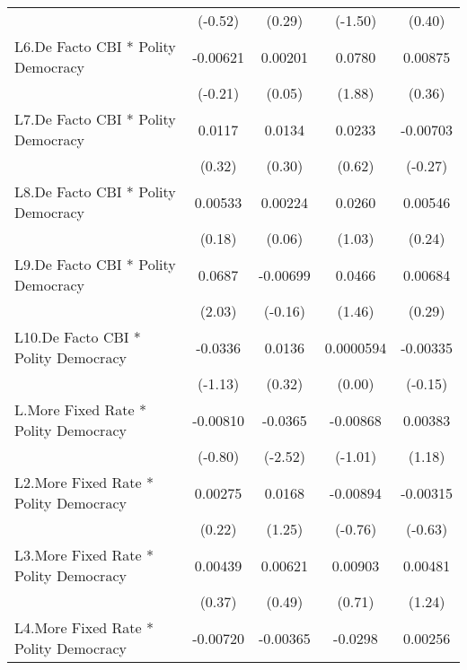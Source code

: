 {\begin{longtable}{l*{4}{c}}
                &  (-0.52)         &   (0.29)         &  (-1.50)         &   (0.40)         \\
[1em]
L6.De Facto CBI * Polity Democracy& -0.00621         &  0.00201         &   0.0780         &  0.00875         \\
                &  (-0.21)         &   (0.05)         &   (1.88)         &   (0.36)         \\
[1em]
L7.De Facto CBI * Polity Democracy&   0.0117         &   0.0134         &   0.0233         & -0.00703         \\
                &   (0.32)         &   (0.30)         &   (0.62)         &  (-0.27)         \\
[1em]
L8.De Facto CBI * Polity Democracy&  0.00533         &  0.00224         &   0.0260         &  0.00546         \\
                &   (0.18)         &   (0.06)         &   (1.03)         &   (0.24)         \\
[1em]
L9.De Facto CBI * Polity Democracy&   0.0687\sym{*}  & -0.00699         &   0.0466         &  0.00684         \\
                &   (2.03)         &  (-0.16)         &   (1.46)         &   (0.29)         \\
[1em]
L10.De Facto CBI * Polity Democracy&  -0.0336         &   0.0136         &0.0000594         & -0.00335         \\
                &  (-1.13)         &   (0.32)         &   (0.00)         &  (-0.15)         \\
[1em]
L.More Fixed Rate * Polity Democracy& -0.00810         &  -0.0365\sym{*}  & -0.00868         &  0.00383         \\
                &  (-0.80)         &  (-2.52)         &  (-1.01)         &   (1.18)         \\
[1em]
L2.More Fixed Rate * Polity Democracy&  0.00275         &   0.0168         & -0.00894         & -0.00315         \\
                &   (0.22)         &   (1.25)         &  (-0.76)         &  (-0.63)         \\
[1em]
L3.More Fixed Rate * Polity Democracy&  0.00439         &  0.00621         &  0.00903         &  0.00481         \\
                &   (0.37)         &   (0.49)         &   (0.71)         &   (1.24)         \\
[1em]
L4.More Fixed Rate * Polity Democracy& -0.00720         & -0.00365         &  -0.0298\sym{*}  &  0.00256         \\

\end{longtable}}
